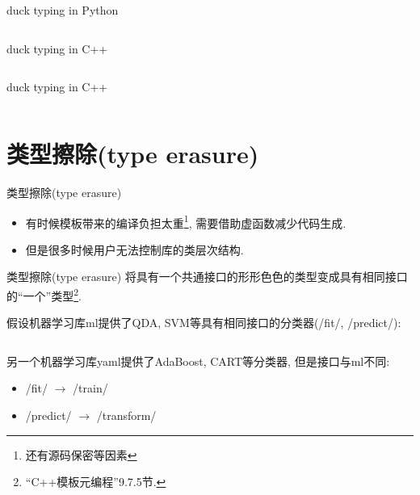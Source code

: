 \documentclass[compress]{beamer}
\begin{document}
\begin{frame}{duck typing in Python}
    \inputminted[fontsize=\footnotesize]{python}{mean.py}
\end{frame}

\begin{frame}{duck typing in C++}
    \inputminted[fontsize=\footnotesize]{cpp}{mean.cpp}
\end{frame}

\begin{frame}{duck typing in C++}
    \inputminted[fontsize=\footnotesize]{cpp}{use_mean.cpp}
\end{frame}

\newcommand{\typeerasure}{类型擦除(type erasure)}
\section{\typeerasure}

\begin{frame}{\typeerasure}
    \begin{itemize}[<+->]
        \item 有时候模板带来的编译负担太重\footnote{还有源码保密等因素}, 需要借助虚函数减少代码生成.
        \item 但是很多时候用户无法控制库的类层次结构.
    \end{itemize}
\end{frame}

\begin{frame}{\typeerasure}
    将具有一个共通接口的形形色色的类型变成具有相同接口的``一个''类型\footnote{``C++模板元编程''9.7.5节.}.
\end{frame}

\begin{frame}
    假设机器学习库ml提供了QDA, SVM等具有相同接口的分类器(/fit/, /predict/):

    \vspace{1em}

    \inputminted[fontsize=\footnotesize]{cpp}{qda.hpp}
\end{frame}

\begin{frame}
    另一个机器学习库yaml提供了AdaBoost, CART等分类器, 但是接口与ml不同:

    \begin{itemize}
        \item {}/fit/ $\to$ /train/
        \item {}/predict/ $\to$ /transform/
    \end{itemize}
\end{frame}
\end{document}
